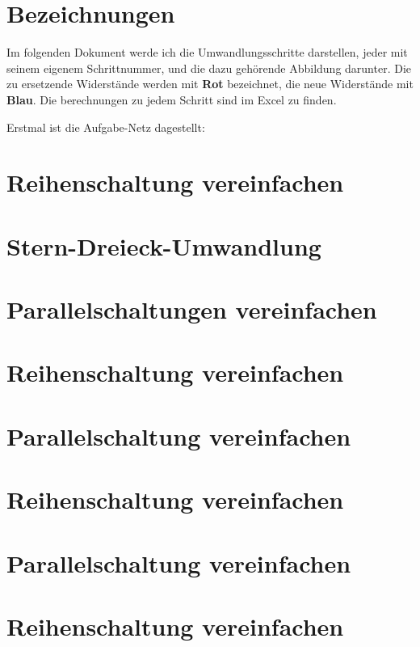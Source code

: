 \documentclass[fleqn,12pt]{article}
\begin{document}
% 
\section{Bezeichnungen}
Im folgenden Dokument werde ich die Umwandlungsschritte darstellen, jeder mit seinem eigenem Schrittnummer, und die dazu gehörende Abbildung darunter. Die zu ersetzende Widerstände werden mit \textbf{Rot} bezeichnet, die neue Widerstände mit \textbf{Blau}. Die berechnungen zu jedem Schritt sind im Excel zu finden.

Erstmal ist die Aufgabe-Netz dagestellt:



\setcounter{section}{0}
\section{Reihenschaltung vereinfachen}

\section{Stern-Dreieck-Umwandlung}

\section{Parallelschaltungen vereinfachen}

\section{Reihenschaltung vereinfachen}

\section{Parallelschaltung vereinfachen}

\section{Reihenschaltung vereinfachen}

\section{Parallelschaltung vereinfachen}

\section{Reihenschaltung vereinfachen}

\end{document}
